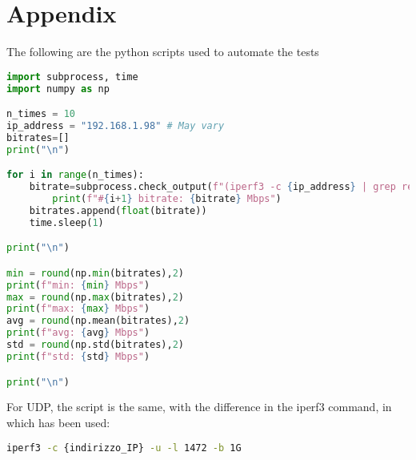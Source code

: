 \section{Appendix}
\label{sec:appendix}

The following are the python scripts used to automate the tests

\begin{lstlisting}[language=Python]
import subprocess, time
import numpy as np

n_times = 10
ip_address = "192.168.1.98" # May vary
bitrates=[]
print("\n")

for i in range(n_times):
	bitrate=subprocess.check_output(f"(iperf3 -c {ip_address} | grep receiver | tr -s ' ' | cut -d ' ' -f 7)",shell=True).decode().strip("\n") 
        print(f"#{i+1} bitrate: {bitrate} Mbps")
	bitrates.append(float(bitrate))
	time.sleep(1)

print("\n")

min = round(np.min(bitrates),2)
print(f"min: {min} Mbps")
max = round(np.max(bitrates),2)
print(f"max: {max} Mbps")
avg = round(np.mean(bitrates),2)
print(f"avg: {avg} Mbps")
std = round(np.std(bitrates),2)
print(f"std: {std} Mbps")

print("\n")
\end{lstlisting}

\vspace{0.5 cm}

For UDP, the script is the same, with the difference in the iperf3 command, in which has been used:
\begin{lstlisting}[language=bash]
iperf3 -c {indirizzo_IP} -u -l 1472 -b 1G
\end{lstlisting}

\vspace{0.5 cm}

